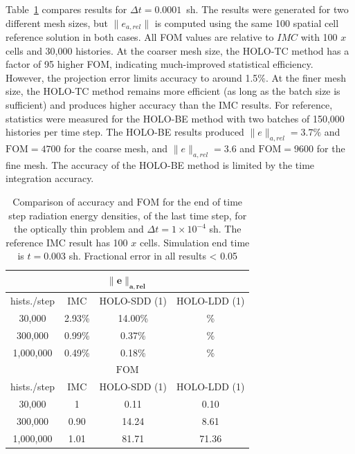 \documentclass{anstrans}
\newcommand{\FOM}{\ensuremath{\text{FOM}}}
\begin{document}
Table~\ref{tab:thin_short} compares results for $\Delta t = 0.0001$~sh.  The results were
generated for two different mesh sizes, but $\|e_{a,rel}\|$ is computed using the same 100
spatial cell reference solution in both cases.  All FOM values are relative to $IMC$ with
100 $x$ cells and 30,000 histories.  At the coarser mesh size, the HOLO-TC method has a
factor of 95 higher FOM, indicating much-improved statistical efficiency.  However, the projection error
limits accuracy to around 1.5$\%$.  At the finer mesh size, the
HOLO-TC method remains more efficient (as long as the batch size is sufficient) and produces higher accuracy than the IMC results.
For reference, statistics were measured for the HOLO-BE method with two batches of 150,000
histories per time step. The HOLO-BE results produced $\|e\|_{a,rel}=3.7\%$ and $\FOM=4700$ for the
coarse mesh, and $\|e\|_{a,rel}=3.6$ and $\FOM=9600$ for the fine mesh.  The accuracy of the HOLO-BE method
is limited by the time integration accuracy.

\begin{table}[H]
\centering
\caption{\label{tab:thin_short} {Comparison of accuracy and $\FOM$ for the end of time
    step radiation energy densities, of the last time step, for the optically
    thin problem and $\Delta t = 1\times 10^{-4}$ sh.  The reference IMC result has 100 $x$ cells.
    Simulation end time is ${t=0.003}$ sh. Fractional error in all results < 0.05}}
\vspace{-0.1in}
\begin{tabular}{|c|ccc|}\cline{2-4}
    \multicolumn{4}{|c|}{$\mathbf{\|e\|_{a,rel}}$} \\ \hline
hists./step   & IMC     & HOLO-SDD (1) &  HOLO-LDD (1)\\ \hline
   30,000     & 2.93\%   & 14.00\%   & \%      \\
  300,000     & 0.99\%   & 0.37\%    & \%      \\ 
  1,000,000   & 0.49\%   & 0.18\%    & \%       \\ \hline
    \multicolumn{4}{|c|}{\textbf{\FOM}} \\ \hline
hists./step   & IMC    & HOLO-SDD (1) &  HOLO-LDD (1)\\ \hline
   30,000     & 1      &  0.11  & 0.10 \\
  300,000     & 0.90   &  14.24 & 8.61 \\
  1,000,000   & 1.01   &  81.71 & 71.36 \\\hline
  \end{tabular}
  \end{table}
\end{document}
